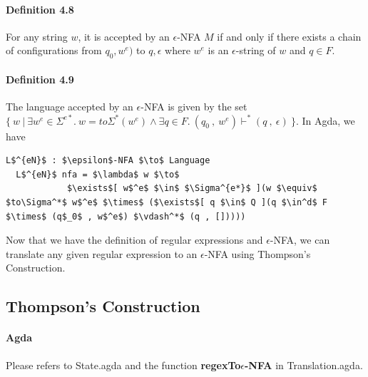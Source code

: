 \documentclass[twoside,openright,final]{bhamthesis}
\begin{document}
\paragraph{Definition 4.8} For any string \(w\), it is accepted by an \(\epsilon\)-NFA \(M\)
if and only if there exists a chain of configurations from \(q_0 ,
w^e)\) to \(q , \epsilon\) where \(w^e\) is an \(\epsilon\)-string of \(w\) and \(q \in
F\). 

\paragraph{Definition 4.9} The language accepted by an
\(\epsilon\)-NFA is given by the set \(\{\ w\ |\ \exists w^e\in
\Sigma^{e*}.\ w = to\Sigma^*(w^e) \wedge \exists q\in F.\ (q_0\ ,\
w^e) \vdash^* (q\ ,\ \epsilon)\ \}\). In Agda, we have
\begin{lstlisting}[mathescape=true,aboveskip=0pt]
  L$^{eN}$ : $\epsilon$-NFA $\to$ Language
  L$^{eN}$ nfa = $\lambda$ w $\to$ 
            $\exists$[ w$^e$ $\in$ $\Sigma^{e*}$ ](w $\equiv$ $to\Sigma^*$ w$^e$ $\times$ ($\exists$[ q $\in$ Q ](q $\in^d$ F $\times$ (q$_0$ , w$^e$) $\vdash^*$ (q , []))))
\end{lstlisting} 
\vspace{1pc}
\par Now that we have the definition of regular expressions and
\(\epsilon\)-NFA, we can translate any given regular expression to an
\(\epsilon\)-NFA using Thompson's Construction.

\subsection{Thompson's Construction}
\paragraph{Agda} Please refers to State.agda and the function
\textbf{regexTo\(\epsilon\)-NFA} in Translation.agda. 
\end{document}
